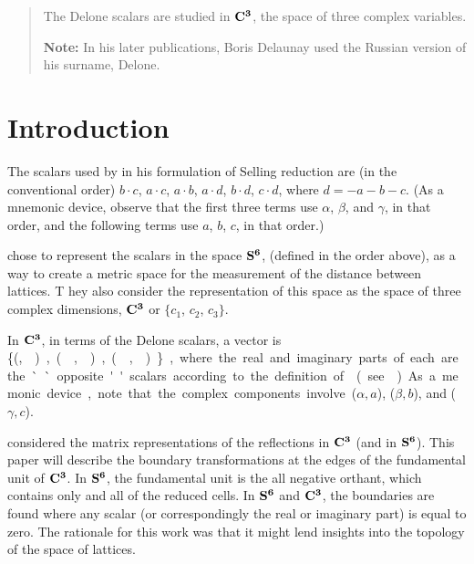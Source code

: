 \documentclass[preprint]{iucr}              %
\numberwithin{equation}{section}
\newcommand{\SVI}[0]{$\bf{S^{6}}$}
\newcommand{\CIII}[0]{$\bf{C^{3}}$}
\begin{document}
	\newcommand{\ci}[0]{$c_1$}
	\newcommand{\cii}[0]{$c_2$}
	\newcommand{\ciii}[0]{$c_3$}
	
	
	\begin{abstract}
		
		The Delone scalars are studied in \CIII, the space of three complex variables.
		
		{\bf Note:}  In his later publications, Boris Delaunay used the Russian version of his surname, Delone.\\
		
		
	\end{abstract}
	
	
	\section{Introduction}
	
	The scalars used by  in his formulation of Selling reduction \cite{Selling1874}
	are (in the conventional order) $b \cdot c$, $a \cdot c$, $a \cdot b$, $a \cdot d$, 
	$b \cdot d$, $c \cdot d$, where $d = -a-b-c$. 
	(As a mnemonic device, 
	observe that the first three terms use
	$\alpha$, $\beta$, and $\gamma$, 
	in that order, 
	and the following terms use $a$, $b$, $c$, in that order.)
	
	 chose to 
	represent the scalars in the space \SVI{},
	\Svec{} (defined in the order above), 
	as a way to create a metric space
	for the measurement of the distance between lattices. T
	hey also consider the representation of this space as the
	space of three complex dimensions, \CIII{} or 
	{$\{c_1$}, {$c_2$}, {$c_3\}$}. 	
	
	In \CIII{}, in terms of the Delone scalars, 
	a vector is \{(\si,\siv ), (\sii,\sv),(\siii,\svi)\}, 
	where the real and imaginary parts
	of each are the ``opposite'' scalars 
	according to the definition of  (see ).
	As a memonic device, 
	note that the complex components involve ($\alpha,a$), ($\beta, b$), and ($\gamma,c$).
	
		 considered the matrix representations of the reflections in \CIII{} (and in \SVI{}). 
		This paper will describe the boundary transformations 
		at the edges of the fundamental	unit of \CIII{}. 
		In \SVI{}, the fundamental unit is the all negative orthant, 
		which contains only and	all of the reduced cells. 
		In \SVI{} and \CIII{}, 
		the boundaries are found where any scalar 
		(or correspondingly the real or imaginary part) 
		is equal to zero. The rationale for this work was 
		that it might lend insights into the topology of
		 the space of lattices. 
	
\end{document}
